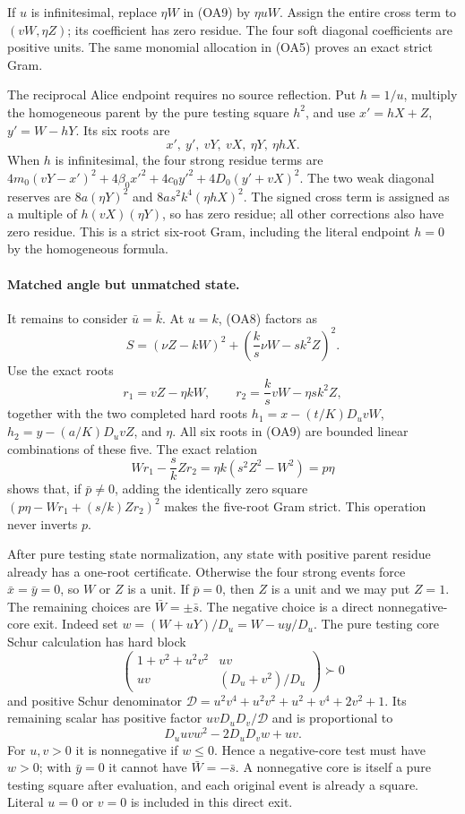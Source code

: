 If $u$ is infinitesimal, replace $\eta W$ in (OA9) by $\eta uW$.
Assign the entire cross term to $(vW,\eta Z)$; its coefficient has
zero residue. The four soft diagonal coefficients are positive units.
The same monomial allocation in (OA5) proves an exact strict Gram.

The reciprocal Alice endpoint requires no source reflection. Put
$h=1/u$, multiply the homogeneous parent by the pure testing square
$h^2$, and use $x'=hX+Z$, $y'=W-hY$. Its six roots are
\[
                 x',\ y',\ vY,\ vX,\ \eta Y,\ \eta hX.
                                                        \tag{OA11}
\]
When $h$ is infinitesimal, the four strong residue terms are
$4m_0(vY-x')^2+4\beta_0x'^2+4c_0y'^2+4D_0(y'+vX)^2$.
The two weak diagonal reserves are $8a(\eta Y)^2$ and
$8as^2k^4(\eta hX)^2$. The signed cross term is assigned as a
multiple of $h(vX)(\eta Y)$, so has zero residue; all other corrections
also have zero residue. This is a strict six-root Gram, including
the literal endpoint $h=0$ by the homogeneous formula.

\paragraph{Matched angle but unmatched state.}
It remains to consider $\bar u=\bar k$. At $u=k$, (OA8) factors as
\[
 S=(\nu Z-kW)^2+
       \left(\frac{k}{s}\nu W-sk^2Z\right)^2.          \tag{OA12}
\]
Use the exact roots
\[
 r_1=vZ-\eta kW,\qquad
 r_2=\frac{k}{s}vW-\eta sk^2Z,
\]
together with the two completed hard roots
$h_1=x-(t/K)D_uvW$, $h_2=y-(a/K)D_uvZ$, and $\eta$.
All six roots in (OA9) are bounded linear combinations of these five.
The exact relation
\[
 Wr_1-\frac{s}{k}Zr_2
   =\eta k(s^2Z^2-W^2)=p\eta                         \tag{OA13}
\]
shows that, if $\bar p\ne0$, adding the identically zero square
$(p\eta-Wr_1+(s/k)Zr_2)^2$ makes the five-root Gram strict.
This operation never inverts $p$.

After pure testing state normalization, any state with positive
parent residue already has a one-root certificate. Otherwise the
four strong events force $\bar x=\bar y=0$, so $W$ or $Z$ is a unit.
If $\bar p=0$, then $Z$ is a unit and we may put $Z=1$.
The remaining choices are $\bar W=\pm\bar s$. The negative choice
is a direct nonnegative-core exit. Indeed set
$w=(W+uY)/D_u=W-uy/D_u$. The pure testing core Schur calculation has hard block
\[
 \begin{pmatrix}1+v^2+u^2v^2&uv\\uv&(D_u+v^2)/D_u\end{pmatrix}\succ0
\]
and positive Schur denominator
$\mathcal D=u^2v^4+u^2v^2+u^2+v^4+2v^2+1$.
Its remaining scalar has positive factor $uvD_uD_v/\mathcal D$
and is proportional to
\[
 D_uuv w^2-2D_uD_vw+uv.
\]
For $u,v>0$ it is nonnegative if $w\leq0$. Hence a negative-core
test must have $w>0$; with $\bar y=0$ it cannot have
$\bar W=-\bar s$. A nonnegative core is itself a pure testing
square after evaluation, and each original event is already a square.
Literal $u=0$ or $v=0$ is included in this direct exit.

